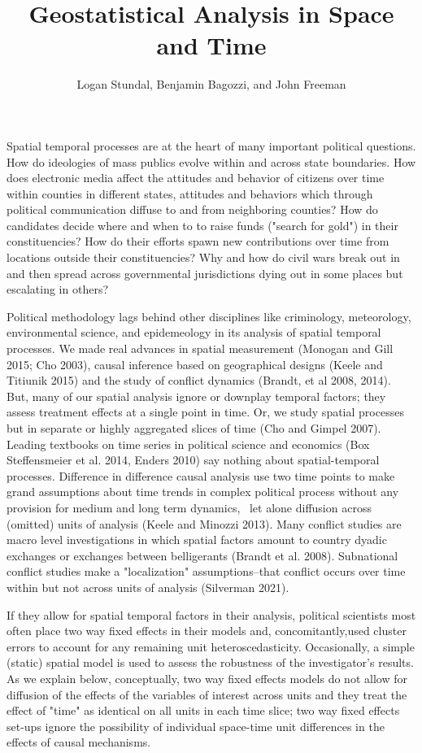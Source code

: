 \documentclass[12pt]{article}
\title{Geostatistical Analysis in Space and Time}
\author{Logan Stundal, Benjamin Bagozzi, and John Freeman}
\begin{document}
\maketitle
\doublespace

Spatial temporal processes are at the heart of many important political questions. How do
ideologies of mass publics evolve within and across state boundaries.
How does electronic media affect the attitudes and behavior of citizens over time
within counties in different states, attitudes and behaviors which through political
communication diffuse to and from neighboring counties? How do candidates decide where and when to
to raise funds ("search for gold") in their
constituencies? How do their efforts spawn new contributions over time
from locations outside their constituencies? Why and how do civil wars break out in and then spread across
governmental jurisdictions dying out in some places but escalating in others?

Political methodology lags behind other disciplines like criminology, meteorology, environmental
science, and epidemeology in its analysis of spatial temporal processes. We made
real advances in spatial measurement (Monogan and Gill 2015; Cho 2003), causal inference based
on geographical designs (Keele and Titiunik 2015) and the study of conflict
dynamics (Brandt, et al 2008, 2014). But, many of our spatial analysis ignore or
downplay temporal factors; they assess treatment effects at a single point in time. Or, we
study spatial processes but in separate or highly aggregated slices of time (Cho and Gimpel 2007).
Leading textbooks on time series in political science and economics
(Box Steffensmeier et al. 2014, Enders 2010) say nothing about spatial-temporal
processes. Difference in difference causal analysis use two time points to
make grand assumptions about time trends in
complex political process without any provision for medium and long term dynamics, \
let alone diffusion across (omitted) units of analysis (Keele and Minozzi 2013).
Many conflict studies are macro level investigations in which spatial factors
amount to country dyadic exchanges or exchanges between  belligerants (Brandt et al. 2008). Subnational
conflict studies make a "localization" assumptions--that conflict occurs over time within
but not across units of analysis (Silverman 2021).

If they allow for spatial temporal factors in their analysis, political scientists most
often place two way fixed effects in their models and, concomitantly,used cluster errors
to account for any remaining unit heteroscedasticity. Occasionally, a
simple (static) spatial model is used to assess the robustness of the
investigator's results. As we explain below, conceptually, two way fixed effects models
do not allow for diffusion of the effects of the variables of interest across
units and they treat the effect of "time" as identical on all units in each
time slice; two way fixed effects set-ups ignore the possibility of individual
space-time unit differences in the effects of causal mechanisms.
\end{document}
